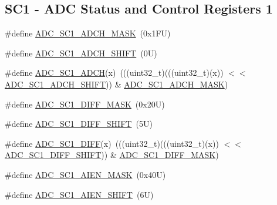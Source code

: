 \subsection*{S\+C1 -\/ A\+DC Status and Control Registers 1}
\begin{DoxyCompactItemize}
\item 
\#define \mbox{\hyperlink{group___a_d_c___register___masks_ga7450ced3c2b2df20023c2152f1470640}{A\+D\+C\+\_\+\+S\+C1\+\_\+\+A\+D\+C\+H\+\_\+\+M\+A\+SK}}~(0x1\+F\+U)
\item 
\#define \mbox{\hyperlink{group___a_d_c___register___masks_gab2ba46d5132224f2920c1881e2c1b6fe}{A\+D\+C\+\_\+\+S\+C1\+\_\+\+A\+D\+C\+H\+\_\+\+S\+H\+I\+FT}}~(0\+U)
\item 
\#define \mbox{\hyperlink{group___a_d_c___register___masks_gab2ec3f01d5b560d3f839439b038f3981}{A\+D\+C\+\_\+\+S\+C1\+\_\+\+A\+D\+CH}}(x)~(((uint32\+\_\+t)(((uint32\+\_\+t)(x)) $<$$<$ \mbox{\hyperlink{group___a_d_c___register___masks_gab2ba46d5132224f2920c1881e2c1b6fe}{A\+D\+C\+\_\+\+S\+C1\+\_\+\+A\+D\+C\+H\+\_\+\+S\+H\+I\+FT}})) \& \mbox{\hyperlink{group___a_d_c___register___masks_ga7450ced3c2b2df20023c2152f1470640}{A\+D\+C\+\_\+\+S\+C1\+\_\+\+A\+D\+C\+H\+\_\+\+M\+A\+SK}})
\item 
\#define \mbox{\hyperlink{group___a_d_c___register___masks_gadc514fb491cf08eb3fb0f27298388645}{A\+D\+C\+\_\+\+S\+C1\+\_\+\+D\+I\+F\+F\+\_\+\+M\+A\+SK}}~(0x20\+U)
\item 
\#define \mbox{\hyperlink{group___a_d_c___register___masks_ga1385c936a9440856068dcb917ed9c658}{A\+D\+C\+\_\+\+S\+C1\+\_\+\+D\+I\+F\+F\+\_\+\+S\+H\+I\+FT}}~(5\+U)
\item 
\#define \mbox{\hyperlink{group___a_d_c___register___masks_ga565092499830413abb547372e66efab1}{A\+D\+C\+\_\+\+S\+C1\+\_\+\+D\+I\+FF}}(x)~(((uint32\+\_\+t)(((uint32\+\_\+t)(x)) $<$$<$ \mbox{\hyperlink{group___a_d_c___register___masks_ga1385c936a9440856068dcb917ed9c658}{A\+D\+C\+\_\+\+S\+C1\+\_\+\+D\+I\+F\+F\+\_\+\+S\+H\+I\+FT}})) \& \mbox{\hyperlink{group___a_d_c___register___masks_gadc514fb491cf08eb3fb0f27298388645}{A\+D\+C\+\_\+\+S\+C1\+\_\+\+D\+I\+F\+F\+\_\+\+M\+A\+SK}})
\item 
\#define \mbox{\hyperlink{group___a_d_c___register___masks_gaa698d898e077003de10a42184de8f124}{A\+D\+C\+\_\+\+S\+C1\+\_\+\+A\+I\+E\+N\+\_\+\+M\+A\+SK}}~(0x40\+U)
\item 
\#define \mbox{\hyperlink{group___a_d_c___register___masks_gaf2cde8fb207dd348e6313d6d0a5b3761}{A\+D\+C\+\_\+\+S\+C1\+\_\+\+A\+I\+E\+N\+\_\+\+S\+H\+I\+FT}}~(6\+U)
\item 

\end{DoxyCompactItemize}
